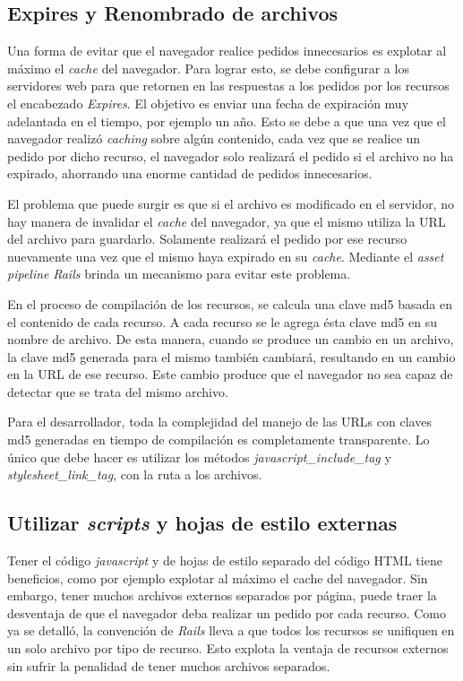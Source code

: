 \subsection{Expires y Renombrado de archivos}

Una forma de evitar que el navegador realice pedidos innecesarios es explotar al máximo el \emph{cache} del navegador. Para lograr esto, se debe configurar a los servidores web para que
retornen en las respuestas a los pedidos por los recursos el encabezado \emph{Expires}. El objetivo es enviar una fecha de expiración muy adelantada en el tiempo, por ejemplo un
año. Esto se debe a que una vez que el navegador realizó \emph{caching} sobre algún contenido, cada vez que se realice un pedido por dicho recurso, el navegador solo realizará
el pedido si el archivo no ha expirado, ahorrando una enorme cantidad de pedidos innecesarios.
 
El problema que puede surgir es que si el archivo es modificado en el servidor, no hay manera de invalidar el \emph{cache} del navegador, ya que el mismo utiliza
la URL del archivo para guardarlo. Solamente realizará el pedido por ese recurso nuevamente una vez que el mismo haya expirado en su \emph{cache}.
Mediante el \emph{asset pipeline} \emph{Rails} brinda un mecanismo para evitar este problema. 

En el proceso de compilación de los recursos, se calcula una clave md5 basada en el
contenido de cada recurso. A cada recurso se le agrega ésta clave md5 en su nombre de archivo. De esta manera, cuando se produce un cambio en un archivo, la clave md5
generada para el mismo también cambiará, resultando en un cambio en la URL de ese recurso. Este cambio produce que el navegador no sea capaz de detectar que se trata del
mismo archivo. 

Para el desarrollador, toda la complejidad del manejo de las URLs con claves md5 generadas en tiempo de compilación es completamente transparente. Lo
único que debe hacer es utilizar los métodos \emph{javascript\_include\_tag} y \emph{stylesheet\_link\_tag}, con la ruta a los archivos.

\subsection{Utilizar \emph{scripts} y hojas de estilo externas}

Tener el código \emph{javascript} y de hojas de estilo separado del código HTML tiene beneficios, como por ejemplo explotar al máximo el cache del navegador. Sin embargo, tener
muchos archivos externos separados por página, puede traer la desventaja de que el navegador deba realizar un pedido por cada recurso. Como ya se detalló, la convención de
\emph{Rails} lleva a que todos los recursos se unifiquen en un solo archivo por tipo de recurso. Esto explota la ventaja de recursos externos sin sufrir la penalidad de tener muchos
archivos separados.

